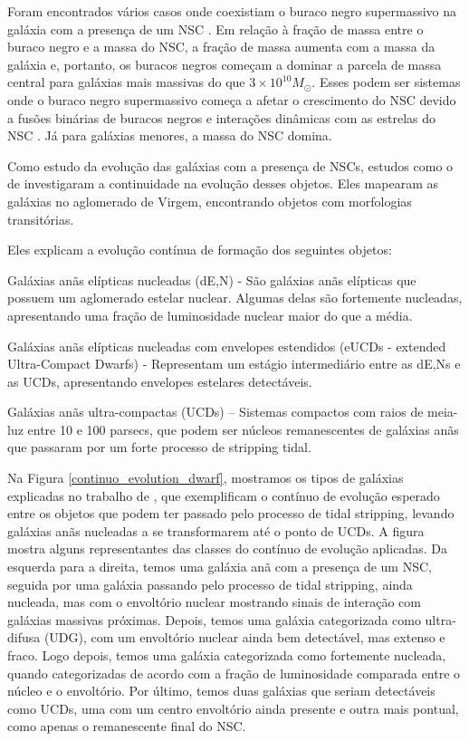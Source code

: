 Foram encontrados vários casos onde coexistiam o buraco negro supermassivo na galáxia com a presença de um NSC \citep{Graham_2009}. Em relação à fração de massa entre o buraco negro e a massa do NSC, a fração de massa aumenta com a massa da galáxia e, portanto, os buracos negros começam a dominar a parcela de massa central para galáxias mais massivas do que $3 \times 10^{10} M_{\odot}$. Esses podem ser sistemas onde o buraco negro supermassivo começa a afetar o crescimento do NSC devido a fusões binárias de buracos negros e interações dinâmicas com as estrelas do NSC \citep{Antonini_2015}. Já para galáxias menores, a massa do NSC domina.

Como estudo da evolução das galáxias com a presença de NSCs, estudos como o de \cite{Wang_2023} investigaram a continuidade na evolução desses objetos. Eles mapearam as galáxias no aglomerado de Virgem, encontrando objetos com morfologias transitórias.

\noindent Eles explicam a evolução contínua de formação dos seguintes objetos:

Galáxias anãs elípticas nucleadas (dE,N) - São galáxias anãs elípticas que possuem um aglomerado estelar nuclear. Algumas delas são fortemente nucleadas, apresentando uma fração de luminosidade nuclear maior do que a média.

Galáxias anãs elípticas nucleadas com envelopes estendidos (eUCDs - extended Ultra-Compact Dwarfs) - Representam um estágio intermediário entre as dE,Ns e as UCDs, apresentando envelopes estelares detectáveis.

Galáxias anãs ultra-compactas (UCDs) – Sistemas compactos com raios de meia-luz entre 10 e 100 parsecs, que podem ser núcleos remanescentes de galáxias anãs que passaram por um forte processo de stripping tidal.

Na Figura \ref{continuo_evolution_dwarf}, mostramos os tipos de galáxias explicadas no trabalho de \cite{Wang_2023}, que exemplificam o contínuo de evolução esperado entre os objetos que podem ter passado pelo processo de tidal stripping, levando galáxias anãs nucleadas a se transformarem até o ponto de UCDs. A figura mostra alguns representantes das classes do contínuo de evolução aplicadas. Da esquerda para a direita, temos uma galáxia anã com a presença de um NSC, seguida por uma galáxia passando pelo processo de tidal stripping, ainda nucleada, mas com o envoltório nuclear mostrando sinais de interação com galáxias massivas próximas. Depois, temos uma galáxia categorizada como ultra-difusa (UDG), com um envoltório nuclear ainda bem detectável, mas extenso e fraco. Logo depois, temos uma galáxia categorizada como fortemente nucleada, quando categorizadas de acordo com a fração de luminosidade comparada entre o núcleo e o envoltório. Por último, temos duas galáxias que seriam detectáveis como UCDs, uma com um centro envoltório ainda presente e outra mais pontual, como apenas o remanescente final do NSC.


